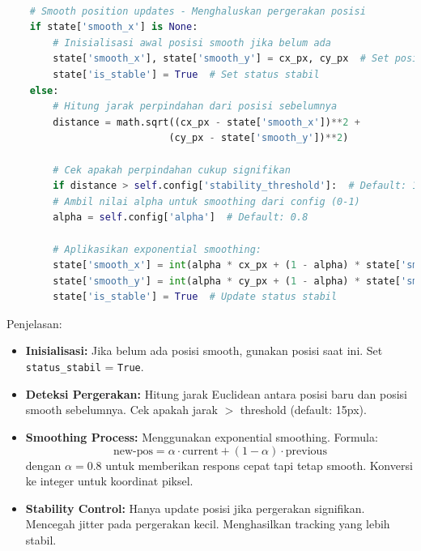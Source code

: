 \documentclass[11pt,a4paper]{article}
\begin{document}
    \begin{lstlisting}[language=Python, caption= Smoothing Posisi]
        
    # Smooth position updates - Menghaluskan pergerakan posisi
    if state['smooth_x'] is None:
        # Inisialisasi awal posisi smooth jika belum ada
        state['smooth_x'], state['smooth_y'] = cx_px, cy_px  # Set posisi awal
        state['is_stable'] = True  # Set status stabil
    else:
        # Hitung jarak perpindahan dari posisi sebelumnya
        distance = math.sqrt((cx_px - state['smooth_x'])**2 + 
                            (cy_px - state['smooth_y'])**2)
        
        # Cek apakah perpindahan cukup signifikan
        if distance > self.config['stability_threshold']:  # Default: 15px
        # Ambil nilai alpha untuk smoothing dari config (0-1)
        alpha = self.config['alpha']  # Default: 0.8
        
        # Aplikasikan exponential smoothing:
        state['smooth_x'] = int(alpha * cx_px + (1 - alpha) * state['smooth_x'])
        state['smooth_y'] = int(alpha * cy_px + (1 - alpha) * state['smooth_y'])
        state['is_stable'] = True  # Update status stabil

    \end{lstlisting}
    Penjelasan: 
    \begin{itemize}
        \item \textbf{Inisialisasi:} Jika belum ada posisi smooth, gunakan posisi saat ini. Set \texttt{status\_stabil} = \texttt{True}.
        
        \item \textbf{Deteksi Pergerakan:} Hitung jarak Euclidean antara posisi baru dan posisi smooth sebelumnya. Cek apakah jarak $>$ threshold (default: 15px).
        
        \item \textbf{Smoothing Process:} Menggunakan exponential smoothing. Formula: 
        \[
        \text{new-pos} = \alpha \cdot \text{current} + (1 - \alpha) \cdot \text{previous}
        \]
        dengan $\alpha = 0.8$ untuk memberikan respons cepat tapi tetap smooth. Konversi ke integer untuk koordinat piksel.
        
        \item \textbf{Stability Control:} Hanya update posisi jika pergerakan signifikan. Mencegah jitter pada pergerakan kecil. Menghasilkan tracking yang lebih stabil.
    \end{itemize}
\end{document}
